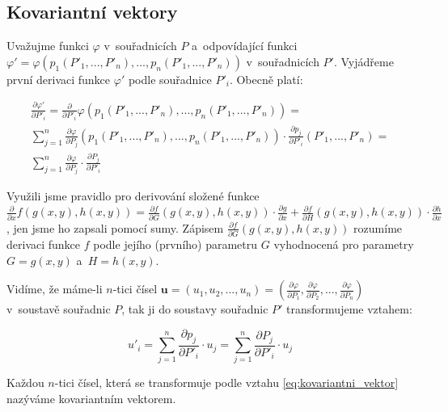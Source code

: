 \documentclass{book}
\newcommand{\vect}[1]{\boldsymbol{#1}}
\begin{document}
\subsection{Kovariantní vektory}

Uvažujme funkci \(\varphi\) v~souřadnicích \(P\) a~odpovídající funkci \(\varphi' = \varphi(p_1(P'_1, ..., P'_n), ..., p_n(P'_1, ..., P'_n))\) v~souřadnicích \(P'\). Vyjádřeme první derivaci funkce \(\varphi'\) podle souřadnice \(P'_i\). Obecně platí:

\begin{equation}
\begin{split}
\frac{\partial \varphi'}{\partial P'_i} = \frac{\partial}{\partial P'_i} \varphi (p_1(P'_1, ..., P'_n), ..., p_n(P'_1, ..., P'_n)) = \\
\sum_{j=1}^n \frac{\partial \varphi}{\partial P_j} (p_1(P'_1, ..., P'_n), ..., p_n(P'_1, ..., P'_n)) \cdot \frac{\partial p_j}{\partial P'_i} (P'_1, ..., P'_n) = \\
\sum_{j=1}^n \frac{\partial \varphi}{\partial P_j} \cdot \frac{\partial P_j}{\partial P'_i}
\end{split}
\end{equation}

Využili jsme pravidlo pro derivování složené funkce \(\frac{\partial}{\partial x} f(g(x, y), h(x, y)) = \frac{\partial f}{\partial G}(g(x, y), h(x, y)) \cdot \frac{\partial g}{\partial x} + \frac{\partial f}{\partial H}(g(x, y), h(x, y)) \cdot \frac{\partial h}{\partial x}\), jen jsme ho zapsali pomocí sumy. Zápisem \(\frac{\partial f}{\partial G}(g(x, y), h(x, y))\) rozumíme derivaci funkce \(f\) podle jejího (prvního) parametru \(G\) vyhodnocená pro parametry \(G = g(x, y)\) a~\(H = h(x, y)\).

Vidíme, že máme-li \(n\)-tici čísel \(\vect{u} = (u_1, u_2, ..., u_n) = \left( \frac{\partial \varphi}{\partial P_1}, \frac{\partial \varphi}{\partial P_2}, ..., \frac{\partial \varphi}{\partial P_n} \right)\) v~soustavě souřadnic \(P\), tak ji do soustavy souřadnic \(P'\) transformujeme vztahem:

\begin{equation}
\label{eq:kovariantni_vektor}
u'_i = \sum_{j=1}^n \frac{\partial p_j}{\partial P'_i} \cdot u_j = \sum_{j=1}^n \frac{\partial P_j}{\partial P'_i} \cdot u_j
\end{equation}

Každou \(n\)-tici čísel, která se transformuje podle vztahu \eqref{eq:kovariantni_vektor} nazýváme kovariantním vektorem.
\end{document}
